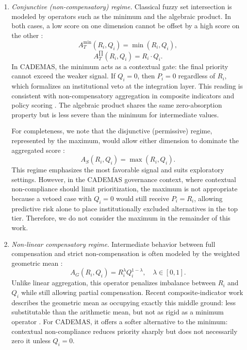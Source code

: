 \documentclass[mathematics,article,submit,moreauthors]{Definitions/mdpi}
\begin{document}
\begin{enumerate}
\item \emph{Conjunctive (non-compensatory) regime.} Classical fuzzy set intersection is modeled by operators such as the minimum and the algebraic product. In both cases, a low score on one dimension cannot be offset by a high score on the other \citep{Zimmermann1980,Klement1996}:
\begin{equation}
A_T^{\min}(R_i, Q_i) = \min(R_i, Q_i),
\end{equation}
\begin{equation}
A_T^{\prod}(R_i, Q_i) = R_i \cdot Q_i.
\end{equation}
In CADEMAS, the minimum acts as a contextual gate: the final priority cannot exceed the weaker signal. If $Q_i = 0$, then $P_i = 0$ regardless of $R_i$, which formalizes an institutional veto at the integration layer. This reading is consistent with non-compensatory aggregation in composite indicators and policy scoring \citep{Natoli2024,Blancas2024}. The algebraic product shares the same zero-absorption property but is less severe than the minimum for intermediate values.

For completeness, we note that the disjunctive (permissive) regime, represented by the maximum, would allow either dimension to dominate the aggregated score \citep{Zimmermann1980,Klement1996}:
\begin{equation}
A_S(R_i, Q_i) = \max(R_i, Q_i).
\end{equation}
This regime emphasizes the most favorable signal and suits exploratory settings. However, in the CADEMAS governance context, where contextual non-compliance should limit prioritization, the maximum is not appropriate because a vetoed case with $Q_i = 0$ would still receive $P_i = R_i$, allowing predictive risk alone to place institutionally excluded alternatives in the top tier. Therefore, we do not consider the maximum in the remainder of this work.

\item \emph{Non-linear compensatory regime.} Intermediate behavior between full compensation and strict non-compensation is often modeled by the weighted geometric mean \citep{Zimmermann1980,Turksen1992,Krejci2018,Mohammadi2023,Natoli2024}:
\begin{equation}
A_G(R_i, Q_i) = R_i^{\lambda} Q_i^{1-\lambda}, \quad \lambda \in [0,1].
\end{equation}
Unlike linear aggregation, this operator penalizes imbalance between $R_i$ and $Q_i$ while still allowing partial compensation. Recent composite-indicator work describes the geometric mean as occupying exactly this middle ground: less substitutable than the arithmetic mean, but not as rigid as a minimum operator \citep{Blancas2024,Natoli2024}. For CADEMAS, it offers a softer alternative to the minimum: contextual non-compliance reduces priority sharply but does not necessarily zero it unless $Q_i = 0$.

\end{enumerate}
\end{document}
